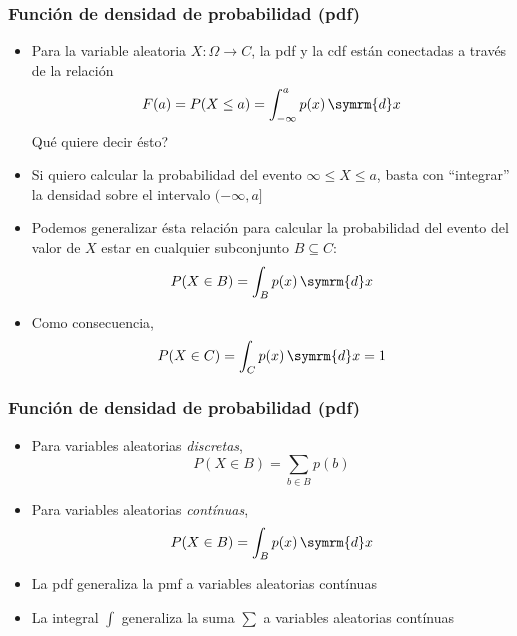 \documentclass[xcolor=dvipsnames,10pt]{beamer}
\begin{document}
%
\begin{frame}
  \frametitle{Función de densidad de probabilidad (pdf)}

  \begin{itemize}
  \item Para la variable aleatoria $X \colon \Omega \to C$, la pdf y la cdf están conectadas a través de la relación
    \begin{equation*}
      F(a) = P(X \leq a) = \int^a_{-\infty} p(x) \, \symrm{d} x
    \end{equation*}
    Qué quiere decir ésto?\pause
  \item Si quiero calcular la probabilidad del evento ${\infty \leq X \leq a}$, basta con ``integrar'' la densidad sobre el intervalo $(-\infty, a]$
  \item Podemos generalizar ésta relación para calcular la probabilidad del evento del valor de $X$ estar en cualquier subconjunto $B \subseteq C$:
    \begin{equation*}
      P(X \in B) = \int_B p(x) \, \symrm{d} x
    \end{equation*}
  \item Como consecuencia,
    \begin{equation*}
      P(X \in C) = \int_C p(x) \, \symrm{d} x = 1
    \end{equation*}
  \end{itemize}
\end{frame}
%
\begin{frame}
  \frametitle{Función de densidad de probabilidad (pdf)}
  \begin{itemize}
  \item Para variables aleatorias \emph{discretas},
    \begin{equation*}
      P(X \in B) = \sum_{b \in B } p(b)
    \end{equation*}
  \item Para variables aleatorias \emph{contínuas},
    \begin{equation*}
      P(X \in B) = \int_B p(x) \, \symrm{d} x
    \end{equation*}
  \item La pdf generaliza la pmf a variables aleatorias contínuas
  \item La integral $\int$ generaliza la suma $\sum$ a variables aleatorias contínuas
  \end{itemize}
\end{frame}
%
\end{document}
